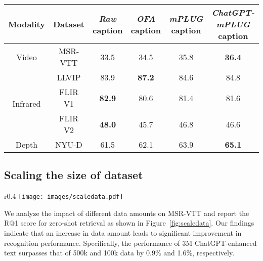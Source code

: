 \documentclass{article} \usepackage{iclr2024_conference,times}
\begin{document}
\begin{table*}[h]
    \small
    \label{tab:inf_dep_text}
    \centering
        \begin{tabular}{c|c|cccc}
            \toprule
            Modality & Dataset & \textit{Raw} caption & \textit{OFA} caption & \textit{mPLUG} caption & \textit{ChatGPT-mPLUG} caption \\ 
            \midrule
            Video & MSR-VTT & 33.5 & 34.5 & 35.8 & \textbf{36.4} \\
            \midrule
            \multirow{3}{*}{Infrared} & LLVIP & 83.9 & \textbf{87.2} & 84.6 & 84.8 \\ 
            & FLIR V1 & \textbf{82.9} & 80.6 & 81.4 & 81.6 \\ 
            & FLIR V2 & \textbf{48.0} & 45.7 & 46.8 & 46.6 \\ 
            \midrule
            Depth & NYU-D & 61.5 & 62.1 & 63.9 & \textbf{65.1} \\ 
            \bottomrule
        \end{tabular}
\end{table*}



\subsection{Scaling the size of dataset}



\begin{wrapfigure}{r}{0.4\textwidth} 
\vspace{-0.2cm} 
\centering
    \texttt{[image: images/scaledata.pdf]} 
    \caption{Scaling pretraining data size.} \label{fig:scaledata}
\vspace{-0.4cm} 
\end{wrapfigure}
We analyze the impact of different data amounts on MSR-VTT and report the R@1 score for zero-shot retrieval as shown in Figure~\ref{fig:scaledata}. Our findings indicate that an increase in data amount leads to significant improvement in recognition performance. 
Specifically, the performance of 3M ChatGPT-enhanced text surpasses that of 500k and 100k data by 0.9\% and 1.6\%, respectively. 
\end{document}
